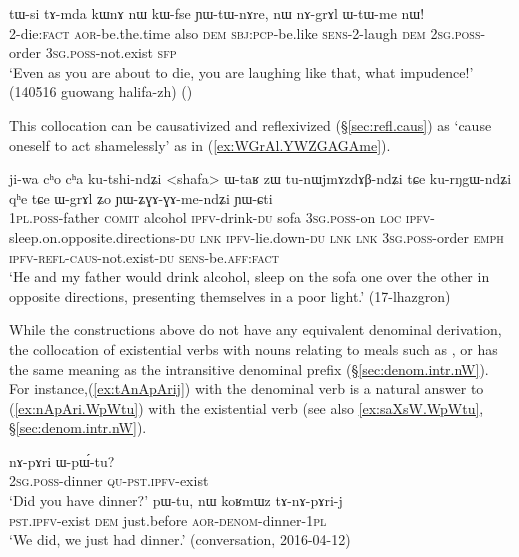 \begin{exe}
\ex \label{ex:nAGrAl.WtWme}
\gll tɯ-si tɤ-mda kɯnɤ nɯ kɯ-fse ɲɯ-tɯ-nɤre, nɯ nɤ-grɤl ɯ-tɯ-me nɯ! \\
2-die:\textsc{fact} \textsc{aor}-be.the.time also \textsc{dem} \textsc{sbj}:\textsc{pcp}-be.like \textsc{sens}-2-laugh \textsc{dem} \textsc{2sg}.\textsc{poss}-order \textsc{3sg}.\textsc{poss}-not.exist \textsc{sfp} \\
\glt `Even as you are about to die, you are laughing like that, what impudence!' (140516 guowang halifa-zh)
()
\end{exe}

This collocation can be causativized and reflexivized (§\ref{sec:refl.caus}) as  `cause oneself to act shamelessly' as in (\ref{ex:WGrAl.YWZGAGAme}).

\begin{exe}
\ex \label{ex:WGrAl.YWZGAGAme}
\gll ji-wa cʰo cʰa ku-tshi-ndʑi <shafa> ɯ-taʁ zɯ tu-nɯjmɤzdɤβ-ndʑi tɕe ku-rŋgɯ-ndʑi qʰe tɕe
ɯ-grɤl ʑo ɲɯ-ʑɣɤ-ɣɤ-me-ndʑi ɲɯ-ɕti \\
\textsc{1pl}.\textsc{poss}-father \textsc{comit} alcohol \textsc{ipfv}-drink-\textsc{du} sofa \textsc{3sg}.\textsc{poss}-on \textsc{loc} \textsc{ipfv}-sleep.on.opposite.directions-\textsc{du} \textsc{lnk} \textsc{ipfv}-lie.down-\textsc{du} \textsc{lnk} \textsc{lnk} \textsc{3sg}.\textsc{poss}-order \textsc{emph} \textsc{ipfv}-\textsc{refl}-\textsc{caus}-not.exist-\textsc{du} \textsc{sens}-be.\textsc{aff}:\textsc{fact}   \\
\glt `He and my father would drink alcohol, sleep on the sofa one over the other in opposite directions, presenting themselves in a poor light.' (17-lhazgron)
\end{exe}


While the constructions above do not have any equivalent denominal derivation, the collocation of existential verbs with nouns relating to meals such as ,  or  has the same meaning as the intransitive  denominal prefix (§\ref{sec:denom.intr.nW}). For instance,(\ref{ex:tAnApArij}) with the denominal verb  is a natural answer to (\ref{ex:nApAri.WpWtu}) with the existential verb (see also \ref{ex:saXsW.WpWtu}, §\ref{sec:denom.intr.nW}).

\begin{exe}
\ex \label{ex:nApAri.WpWtu}
\gll nɤ-pɤri ɯ-pɯ́-tu? \\
\textsc{2sg}.\textsc{poss}-dinner \textsc{qu}-\textsc{pst}.\textsc{ipfv}-exist \\
\glt `Did you have dinner?'
\ex \label{ex:tAnApArij}
\gll pɯ-tu, nɯ koʁmɯz tɤ-nɤ-pɤri-j \\
\textsc{pst}.\textsc{ipfv}-exist \textsc{dem} just.before \textsc{aor}-\textsc{denom}-dinner-\textsc{1pl} \\
\glt `We did, we just had dinner.' (conversation, 2016-04-12)
\end{exe}
  
